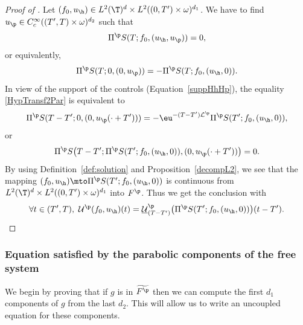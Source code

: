\begin{proof}[Proof of ]
Let $(f_0,u_{\h}) \in L^2(\T)^d\times L^2((0,T')\times \omega)^{d_1}$. We have to find $u_{\p}\in C^\infty_c((T',T)\times\omega)^{d_2}$ such that
\begin{equation}
\label{HypTransf1Par}
\Pi^{\p} S(T;f_0, (u_{\h},u_{\p}))= 0,
\end{equation}
or equivalently,
\begin{equation}
\label{HypTransf2Par}
\Pi^{\p} S(T;0, (0,u_{\p}))= -\Pi^{\p} S(T;f_0, (u_{\h},0)).
\end{equation}
In view of the support of the controls (Equation~\eqref{suppHhHp}), the equality \eqref{HypTransf2Par} is equivalent to
\begin{equation}
\label{HypTransf3Par}
\Pi^{\p} S(T-T';0, (0,u_{\p}(\cdot+T')))= - \eu^{-(T-T')\mathcal{L}^{\p}} \Pi^{\p} S(T';f_0, (u_{\h},0)),
\end{equation}
or
\begin{equation}
\label{HypTransf3Par2}
\Pi^{\p} S\bigl(T-T'; \Pi^{\p} S(T';f_0, (u_{\h},0)), (0,u_{\p}(\cdot+T')) \bigr)= 0.
\end{equation}
By using Definition~\ref{def:solution} and Proposition~\ref{decompL2}, we see that the mapping $(f_0, u_{\h}) \mto \Pi^{\p} S(T';f_0, (u_{\h},0))$ is continuous from $L^2(\T)^d \times L^2((0,T')\times \omega)^{d_1}$ into $F^{\p}$. Thus we get the conclusion with
\[
\forall t \in (T',T),\
\mathcal{U}^\p(f_0,u_{\h})(t)=\underline{\mathcal{U}}_{(T-T')}^\p\bigl(\Pi^{\p} S(T';f_0, (u_{\h},0)) \bigr)(t-T').\qedhere
\]
\end{proof}

\subsubsection{Equation satisfied by the parabolic components of the free system}

We begin by proving that if $g$ is in $\widetilde{F^\p}$ then we can compute the first $d_1$ components of $g$ from the last $d_2$. This will allow us to write an uncoupled equation for these components.

